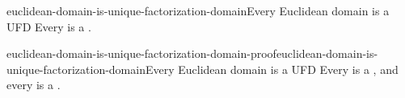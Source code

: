 \documentclass[preview]{standalone}
\begin{document}
\begin{snippetcorollary}{euclidean-domain-is-unique-factorization-domain}{Every Euclidean domain is a UFD}
    Every \euclideandomain is a \uniquefactorizationdomain.
\end{snippetcorollary}

\begin{snippetproof}{euclidean-domain-is-unique-factorization-domain-proof}{euclidean-domain-is-unique-factorization-domain}{Every Euclidean domain is a UFD}
    Every \euclideandomain is a \principalidealdomain, and every
    \principalidealdomain is a \uniquefactorizationdomain.
\end{snippetproof}
\end{document}
